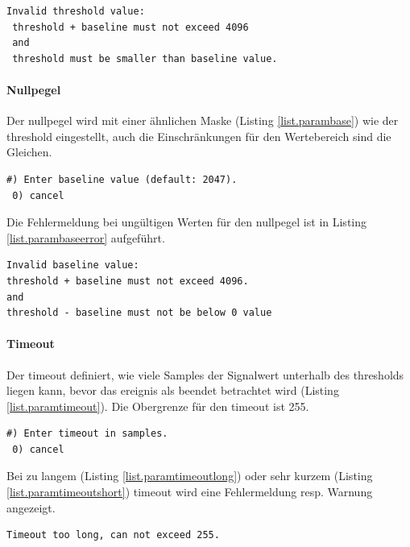 \begin{lstlisting}[caption=Fehlermeldung ungültiger Threshold, label=list.paramthresfail]
 Invalid threshold value:
 threshold + baseline must not exceed 4096
 and
 threshold must be smaller than baseline value.
\end{lstlisting}

\paragraph{Nullpegel} Der \gls{nullpegel} wird mit einer ähnlichen Maske (Listing \ref{list.parambase}) wie der \gls{threshold} eingestellt, auch die Einschränkungen für den Wertebereich sind die Gleichen.

\begin{lstlisting}[caption=Untermenü Null-Level, label=list.parambase]
 #) Enter baseline value (default: 2047).
 0) cancel
\end{lstlisting}

Die Fehlermeldung bei ungültigen Werten für den \gls{nullpegel} ist in Listing \ref{list.parambaseerror} aufgeführt.

\begin{lstlisting}[caption=Fehlermeldung ungültiger Nullpegel, label=list.parambaseerror]
Invalid baseline value:
threshold + baseline must not exceed 4096.
and
threshold - baseline must not be below 0 value
\end{lstlisting}

\paragraph{Timeout} Der \gls{timeout} definiert, wie viele Samples der Signalwert unterhalb des \gls{threshold}s liegen kann, bevor das \gls{ereignis} als beendet betrachtet wird (Listing \ref{list.paramtimeout}). Die Obergrenze für den \gls{timeout} ist 255.

\begin{lstlisting}[caption=Untermenü Timeout, label=list.paramtimeout]
 #) Enter timeout in samples.
 0) cancel
\end{lstlisting}

Bei zu langem (Listing \ref{list.paramtimeoutlong}) oder sehr kurzem (Listing \ref{list.paramtimeoutshort}) \gls{timeout} wird eine Fehlermeldung resp. Warnung angezeigt.

\begin{lstlisting}[caption=Fehlermeldung zu langer Timeout, label=list.paramtimeoutlong]
Timeout too long, can not exceed 255.
\end{lstlisting}

